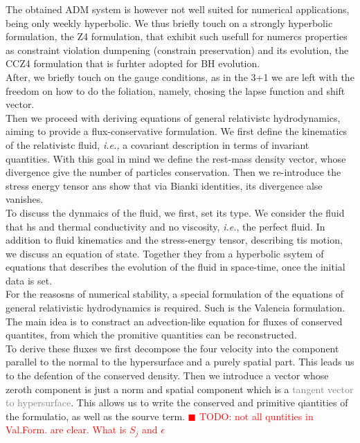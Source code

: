 \documentclass[11pt,a4paper,headinclude=true,DIV=14,BCOR=8mm,chapterprefix,listof=totoc,twoside,openright,abstracton]{scrbook}
\newcommand{\todo}[1]{\textcolor{red}{$\blacksquare$ TODO: #1}}
\begin{document}
The obtained ADM system is however not well suited for numerical applications, being only weekly hyperbolic. We thus briefly touch on a strongly hyperbolic formulation, the Z4 formulation, that exhibit such usefull for numercs properties as constraint violation dumpening (constrain preservation) and its evolution, the CCZ4 formulation that is furhter adopted for BH evolution. \\

After, we briefly touch on the gauge conditions, as in the 3+1 we are left with the freedom on how to do the foliation, namely, chosing the lapse function and shift vector. \\

Then we proceed with deriving equations of general relativistc hydrodynamics, aiming to provide a flux-conservative formulation. We first define the kinematics of the relativistc fluid, \textit{i.e.,} a covariant description in terms of invariant quantities. With this goal in mind we define the rest-mass density vector, whose divergence give the number of particles conservation. Then we re-introduce the stress energy tensor ans show that via Bianki identities, its divergence alse vanishes. \\

To discuss the dynmaics of the fluid, we first, set its type. We consider the fluid that hs and thermal conductivity and no viscosity, \textit{i.e.}, the perfect fluid. In addition to fluid kinematics and the stress-energy tensor, describing tis motion, we discuss an equation of state. Together they from a hyperbolic ssytem of equations that describes the evolution of the fluid in space-time, once the initial data is set.\\

For the reasosns of numerical stability, a special formulation of the equations of general relativistic hydrodynamics is required. Such is the Valencia formulation. The main idea is to constract an advection-like equation for fluxes of conserved quantites, from which the promitive quantities can be reconstructed.\\ 

To derive these fluxes we first decompose the four velocity into the component parallel to the normal to the hypersurface and a purely spatial part. This leads us to the defention of the conserved density. Then we introduce a vector whose zeroth component is just a norm and spatial component which is a \textcolor{gray}{tangent vector to hypersurface}. This allows us to write the conserved and primitive qiantities of the formulatio, as well as the sourve term. \todo{not all quntities in Val.Form. are clear. What is $S_j$ and $\epsilon$} \\
\end{document}
